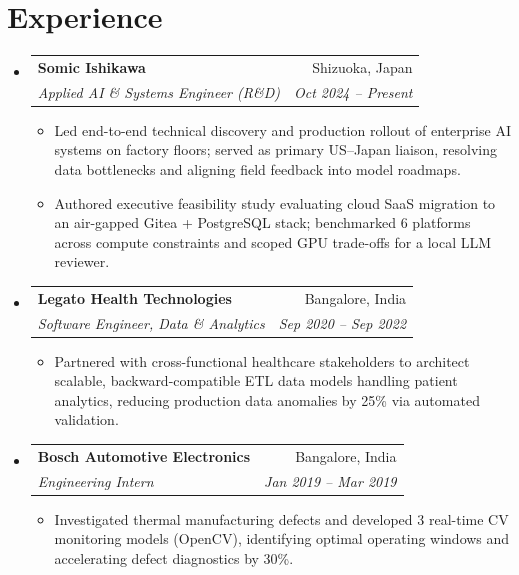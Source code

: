 \documentclass[letterpaper,10pt]{article}
\makeatletter
\newcommand{\resumeItem}[1]{
  \item\small{
    {#1 \vspace{-1pt}}
  }
}
\newcommand{\resumeSubheading}[4]{
  \vspace{1.5pt}\item
    \begin{tabular*}{0.97\textwidth}[t]{l@{\extracolsep{\fill}}r}
      \textbf{#1} & #2 \\
      \textit{\small#3} & \textit{\small #4} \\
    \end{tabular*}\vspace{-5pt}
}
\newcommand{\resumeSubHeadingListStart}{\begin{itemize}[leftmargin=0.15in, label={}]}
\newcommand{\resumeSubHeadingListEnd}{\end{itemize}}
\newcommand{\resumeItemListStart}{\begin{itemize}}
\newcommand{\resumeItemListEnd}{\end{itemize}\vspace{-2pt}}
\makeatother
\begin{document}
\section{Experience}
  \resumeSubHeadingListStart

    \resumeSubheading
      {Somic Ishikawa}{Shizuoka, Japan}
      {Applied AI \& Systems Engineer (R\&D)}{Oct 2024 -- Present}
      \resumeItemListStart
        \resumeItem{Led end-to-end technical discovery and production rollout of enterprise AI systems on factory floors; served as primary US--Japan liaison, resolving data bottlenecks and aligning field feedback into model roadmaps.}
        \resumeItem{Authored executive feasibility study evaluating cloud SaaS migration to an air-gapped Gitea + PostgreSQL stack; benchmarked 6 platforms across compute constraints and scoped GPU trade-offs for a local LLM reviewer.}
      \resumeItemListEnd

    \resumeSubheading
      {Legato Health Technologies}{Bangalore, India}
      {Software Engineer, Data \& Analytics}{Sep 2020 -- Sep 2022}
      \resumeItemListStart
        \resumeItem{Partnered with cross-functional healthcare stakeholders to architect scalable, backward-compatible ETL data models handling patient analytics, reducing production data anomalies by 25\% via automated validation.}
      \resumeItemListEnd

    \resumeSubheading
      {Bosch Automotive Electronics}{Bangalore, India}
      {Engineering Intern}{Jan 2019 -- Mar 2019}
      \resumeItemListStart
        \resumeItem{Investigated thermal manufacturing defects and developed 3 real-time CV monitoring models (OpenCV), identifying optimal operating windows and accelerating defect diagnostics by 30\%.}
      \resumeItemListEnd

  \resumeSubHeadingListEnd


\end{document}
